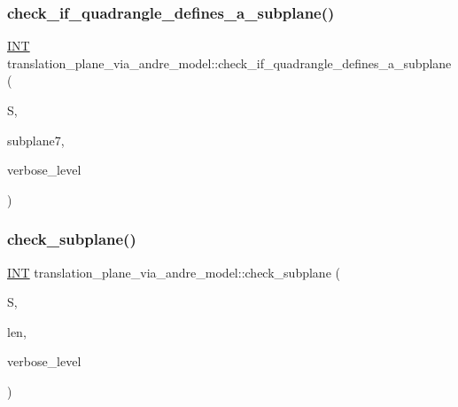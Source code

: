 \subsubsection{\texorpdfstring{check\+\_\+if\+\_\+quadrangle\+\_\+defines\+\_\+a\+\_\+subplane()}{check\_if\_quadrangle\_defines\_a\_subplane()}}
{\footnotesize\ttfamily \mbox{\hyperlink{galois_8h_a09fddde158a3a20bd2dcadb609de11dc}{I\+NT}} translation\+\_\+plane\+\_\+via\+\_\+andre\+\_\+model\+::check\+\_\+if\+\_\+quadrangle\+\_\+defines\+\_\+a\+\_\+subplane (\begin{DoxyParamCaption}\item[{\mbox{\hyperlink{galois_8h_a09fddde158a3a20bd2dcadb609de11dc}{I\+NT}} $\ast$}]{S,  }\item[{\mbox{\hyperlink{galois_8h_a09fddde158a3a20bd2dcadb609de11dc}{I\+NT}} $\ast$}]{subplane7,  }\item[{\mbox{\hyperlink{galois_8h_a09fddde158a3a20bd2dcadb609de11dc}{I\+NT}}}]{verbose\+\_\+level }\end{DoxyParamCaption})}

\mbox{\label{classtranslation__plane__via__andre__model_a00134f526f42e78cd89dfa0cad148c77}} 
\subsubsection{\texorpdfstring{check\+\_\+subplane()}{check\_subplane()}}
{\footnotesize\ttfamily \mbox{\hyperlink{galois_8h_a09fddde158a3a20bd2dcadb609de11dc}{I\+NT}} translation\+\_\+plane\+\_\+via\+\_\+andre\+\_\+model\+::check\+\_\+subplane (\begin{DoxyParamCaption}\item[{\mbox{\hyperlink{galois_8h_a09fddde158a3a20bd2dcadb609de11dc}{I\+NT}} $\ast$}]{S,  }\item[{\mbox{\hyperlink{galois_8h_a09fddde158a3a20bd2dcadb609de11dc}{I\+NT}}}]{len,  }\item[{\mbox{\hyperlink{galois_8h_a09fddde158a3a20bd2dcadb609de11dc}{I\+NT}}}]{verbose\+\_\+level }\end{DoxyParamCaption})}

\mbox{\label{classtranslation__plane__via__andre__model_ac8f002e812a8b152d41e806688601c5e}} 

